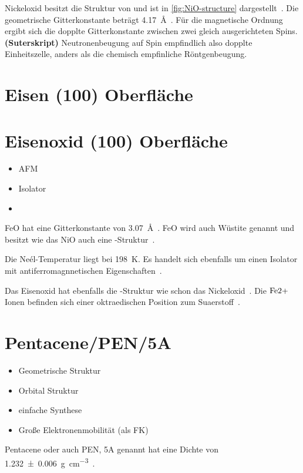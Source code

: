         Nickeloxid besitzt die Struktur von  und ist in \autoref{fig:NiO-structure} dargestellt~\cite{kunz_chemisorption_1985}. 
        Die geometrische Gitterkonstante beträgt \SI{4.17}{\angstrom}~\cite{sebbari_uranyl_2012}.
        Für die magnetische Ordnung ergibt sich die dopplte Gitterkonstante zwischen zwei gleich ausgerichteten Spins. \textbf{(Suterskript)}
        Neutronenbeugung auf Spin empfindlich also dopplte Einheitszelle, anders als die chemisch empfinliche Röntgenbeugung.
    
    \section{Eisen (100) Oberfläche}

    \section{Eisenoxid (100) Oberfläche}
        \begin{itemize}
            \item AFM
            \item Isolator
            \item 
        \end{itemize}
        FeO hat eine Gitterkonstante von \SI{3.07}{\angstrom}~\cite{FeO_1}.
        FeO wird auch Wüstite genannt und besitzt wie das NiO auch eine -Struktur~\cite{FeO_4}.
        
        Die Neél-Temperatur liegt bei \SI{198}{\kelvin}.
        Es handelt sich ebenfalls um einen Isolator mit antiferromagnnetischen Eigenschaften~\cite{FeO_4}.

        Das Eisenoxid hat ebenfalls die -Struktur wie schon das Nickeloxid~\cite{FeO_4}.
        Die $\ce{Fe{2+}}$ Ionen befinden sich einer oktraedischen Position zum Suaerstoff~\cite{FeO_4}.

    \section{Pentacene/PEN/5A}
        \begin{itemize}
            \item Geometrische Struktur
            \item Orbital Struktur
            \item einfache Synthese
            \item Große Elektronenmobilität (als FK)
        \end{itemize}
        Pentacene oder auch PEN, 5A genannt hat eine Dichte von \SI{1.232(6)}{\gram\per\cubic\centi\meter}~\cite{CAS}.
        
